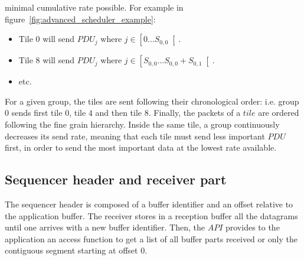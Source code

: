 \documentclass[a4paper]{article}
\begin{document}
        minimal cumulative rate possible. For example in
        figure~\ref{fig:advanced_scheduler_example}:
        \begin{itemize}
            \item{
                Tile 0 will send $PDU_j$ where $j \in \left[0...S_{0,0}\right[$.
            }
            \item{
                Tile 8 will send $PDU_j$ where $j \in
                    \left[S_{0,0}...S_{0,0}+S_{0,1}\right[$.
            }
            \item{
                etc.
            }
        \end{itemize}
        For a given group, the tiles are sent following their chronological
        order: i.e. group $0$ sends first tile $0$, tile $4$ and then tile $8$.
        Finally, the packets of a $tile$ are ordered following the fine grain
        hierarchy.  Inside the same tile, a group continuously decreases its
        send rate, meaning that each tile must send less important $PDU$ first,
        in order to send the most important data at the lowest rate available.

    \subsection{Sequencer header and receiver part}
        The sequencer header is composed of a buffer identifier and an offset
        relative to the application buffer. The receiver stores in a reception
        buffer all the datagrams until one arrives with a new buffer identifier.
        Then, the $API$ provides to the application an access function to
        get a list of all buffer parts received or only the contiguous
        segment starting at offset $0$.
\end{document}
